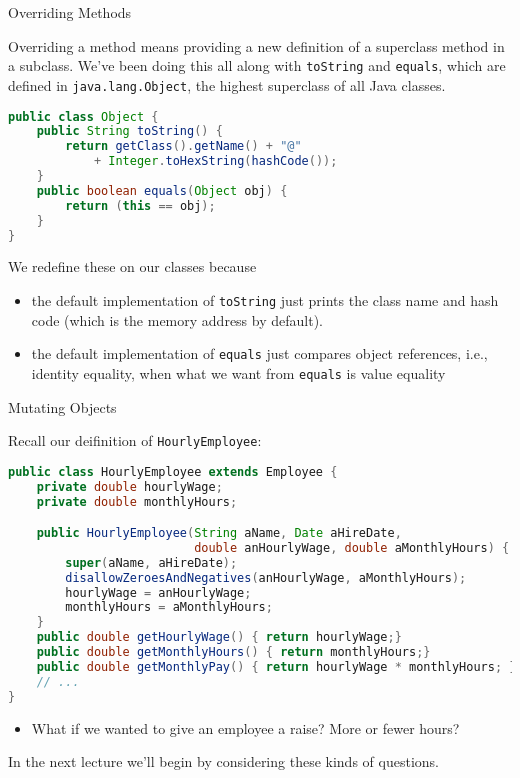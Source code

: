 \documentclass{beamer}
\begin{document}
\begin{frame}[fragile]{Overriding Methods}


Overriding a method means providing a new definition of a superclass method in a subclass.  We've been doing this all along with {\tt toString} and {\tt equals}, which are defined in {\tt java.lang.Object}, the highest superclass of all Java classes.
\vspace{-.05in}
\begin{lstlisting}[language=Java]
public class Object {
    public String toString() {
        return getClass().getName() + "@" 
            + Integer.toHexString(hashCode());
    }
    public boolean equals(Object obj) {
        return (this == obj);
    }
}
\end{lstlisting}
\vspace{-.1in}
We redefine these on our classes because
\begin{itemize}
\item the default implementation of {\tt toString} just prints the class name and hash code (which is the memory address by default).
\item the default implementation of {\tt equals} just compares object references, i.e., identity equality, when what we want from {\tt equals} is value equality
\end{itemize}


\end{frame}

\begin{frame}[fragile]{Mutating Objects}


Recall our deifinition of {\tt HourlyEmployee}:
\vspace{-.05in}
\begin{lstlisting}[language=Java]
public class HourlyEmployee extends Employee {
    private double hourlyWage;
    private double monthlyHours;

    public HourlyEmployee(String aName, Date aHireDate,
                          double anHourlyWage, double aMonthlyHours) {
        super(aName, aHireDate);
        disallowZeroesAndNegatives(anHourlyWage, aMonthlyHours);
        hourlyWage = anHourlyWage;
        monthlyHours = aMonthlyHours;
    }
    public double getHourlyWage() { return hourlyWage;}
    public double getMonthlyHours() { return monthlyHours;}
    public double getMonthlyPay() { return hourlyWage * monthlyHours; }
    // ...
}
\end{lstlisting}
\vspace{-.1in}
\begin{itemize}
\item What if we wanted to give an employee a raise?  More or fewer hours?
\end{itemize}

In the next lecture we'll begin by considering these kinds of questions.

\end{frame}
\end{document}
